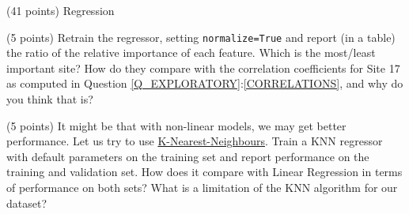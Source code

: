 \documentclass[12pt]{article}
\begin{document}
\begin{question}{\label{Q_LR_BA}(41 points) Regression}
\begin{subquestion}{(5 points) Retrain the regressor, setting \texttt{normalize=True} and report (in a table) the ratio of the relative importance of each feature. Which is the most/least important site? How do they compare with the correlation coefficients for Site 17 as computed in Question \ref{Q_EXPLORATORY}:\ref{CORRELATIONS}, and why do you think that is?}






\end{subquestion}

\begin{subquestion}{(5 points) It might be that with non-linear models, we may get better performance. Let us try to use \href{https://scikit-learn.org/stable/modules/generated/sklearn.neighbors.KNeighborsRegressor.html}{K-Nearest-Neighbours}. Train a KNN regressor with default parameters on the training set and report performance on the training and validation set.  How does it compare with Linear Regression in terms of performance on both sets? What is a limitation of the KNN algorithm for our dataset?}




\end{subquestion}
\end{question}
\end{document}
